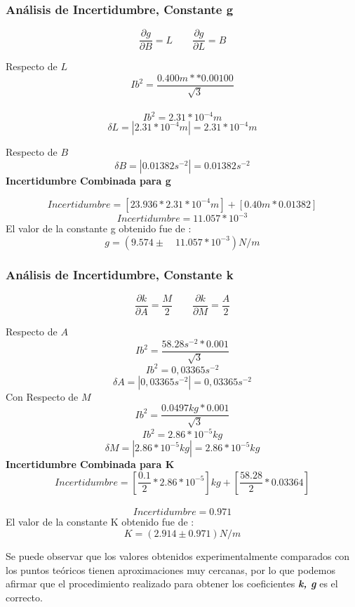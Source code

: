 \documentclass{article}
\begin{document}
\subsubsection{Análisis de Incertidumbre, Constante \textbf{g} }
\begin{equation}
\frac{\partial g}{\partial B} =L \qquad \frac{\partial g}{\partial L} = B
\end{equation}

Respecto de $L$
$${ Ib }^{ 2 }=\frac { 0.400m**0.00100 }{ \sqrt { 3 }  } $$
\\
$${ Ib }^{ 2 }=2.31*{10}^{ -4 }m$$
$$\delta L=|2.31*{10}^{ -4 }m|= 2.31*{10}^{ -4 }m$$

Respecto de $B$\\
$$\delta B=|0.01382{s}^{-2}|= 0.01382{s}^{-2}$$
\textbf{Incertidumbre Combinada para g}

$$Incertidumbre=\left[ 23.936* 2.31*{ 10 }^{ -4 }m \right] +\left[ 0.40m*0.01382\right]$$
$$Incertidumbre=11.057*{ 10 }^{ -3 }$$
El valor de la constante g obtenido fue de :
$$g=(9.574\pm \quad 11.057*{ 10 }^{ -3 })N/m$$

\subsubsection{Análisis de Incertidumbre, Constante \textbf{k} }
\begin{equation}
\frac{\partial k}{\partial A} = \frac{M}{2} \qquad \frac{\partial k}{\partial M} = \frac{A}{2} 
\end{equation}

Respecto de $A$
$${ Ib }^{ 2 }=\frac { 58.28{ s }^{ -2 }*0.001 }{ \sqrt { 3 }  } $$
$$
{ Ib }^{ 2 }=0,03365{ s }^{ -2 }$$
$$\delta A=|0,03365{ s }^{ -2 }|=0,03365{ s }^{ -2 }$$
Con Respecto de $M$
$${ Ib }^{ 2 }=\frac { 0.0497kg*0.001 }{ \sqrt { 3 }  } $$
$$
{ Ib }^{ 2 }=2.86*{10}^{ -5 }kg$$
$$\delta M=|2.86*{10}^{ -5 }kg|=2.86*{10}^{ -5 }kg$$
\textbf{Incertidumbre Combinada para K}
$$Incertidumbre=\left[ \frac { 0.1 }{ 2 } *2.86*{ 10 }^{ -5 } \right] kg+\left[ \frac { 58.28 }{ 2 } *0.03364\right]$$
\\$$
Incertidumbre=0.971
$$
El valor de la constante K obtenido fue de :
$$K=(2.914\pm 0.971)N/m$$

Se puede observar que los valores obtenidos experimentalmente comparados con los puntos teóricos tienen aproximaciones muy cercanas, por lo que podemos afirmar que el procedimiento realizado para obtener los coeficientes \textbf{\textit{k, g}} es el correcto. 
\end{document}
